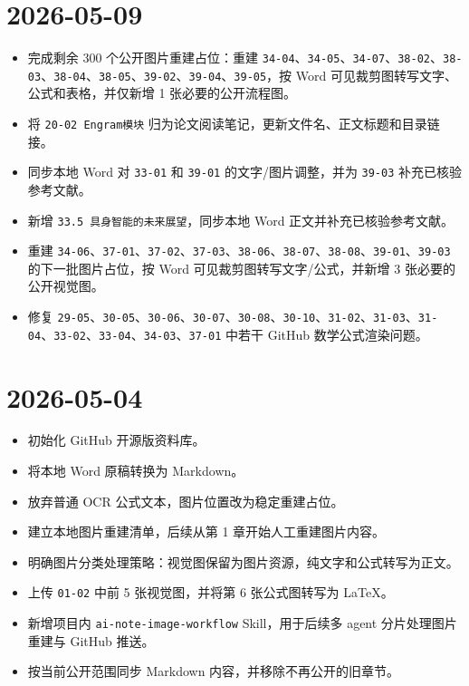 \hypertarget{section-3}{%
\section{2026-05-09}\label{section-3}}

\begin{itemize}
\tightlist
\item
  完成剩余 300 个公开图片重建占位：重建 \texttt{34-04}、\texttt{34-05}、\texttt{34-07}、\texttt{38-02}、\texttt{38-03}、\texttt{38-04}、\texttt{38-05}、\texttt{39-02}、\texttt{39-04}、\texttt{39-05}，按 Word 可见裁剪图转写文字、公式和表格，并仅新增 1 张必要的公开流程图。
\item
  将 \texttt{20-02\ Engram模块} 归为论文阅读笔记，更新文件名、正文标题和目录链接。
\item
  同步本地 Word 对 \texttt{33-01} 和 \texttt{39-01} 的文字/图片调整，并为 \texttt{39-03} 补充已核验参考文献。
\item
  新增 \texttt{33.5\ 具身智能的未来展望}，同步本地 Word 正文并补充已核验参考文献。
\item
  重建 \texttt{34-06}、\texttt{37-01}、\texttt{37-02}、\texttt{37-03}、\texttt{38-06}、\texttt{38-07}、\texttt{38-08}、\texttt{39-01}、\texttt{39-03} 的下一批图片占位，按 Word 可见裁剪图转写文字/公式，并新增 3 张必要的公开视觉图。
\item
  修复 \texttt{29-05}、\texttt{30-05}、\texttt{30-06}、\texttt{30-07}、\texttt{30-08}、\texttt{30-10}、\texttt{31-02}、\texttt{31-03}、\texttt{31-04}、\texttt{33-02}、\texttt{33-04}、\texttt{34-03}、\texttt{37-01} 中若干 GitHub 数学公式渲染问题。
\end{itemize}

\hypertarget{section-4}{%
\section{2026-05-04}\label{section-4}}

\begin{itemize}
\tightlist
\item
  初始化 GitHub 开源版资料库。
\item
  将本地 Word 原稿转换为 Markdown。
\item
  放弃普通 OCR 公式文本，图片位置改为稳定重建占位。
\item
  建立本地图片重建清单，后续从第 1 章开始人工重建图片内容。
\item
  明确图片分类处理策略：视觉图保留为图片资源，纯文字和公式转写为正文。
\item
  上传 \texttt{01-02} 中前 5 张视觉图，并将第 6 张公式图转写为 LaTeX。
\item
  新增项目内 \texttt{ai-note-image-workflow} Skill，用于后续多 agent 分片处理图片重建与 GitHub 推送。
\item
  按当前公开范围同步 Markdown 内容，并移除不再公开的旧章节。
\end{itemize}

\clearpage
